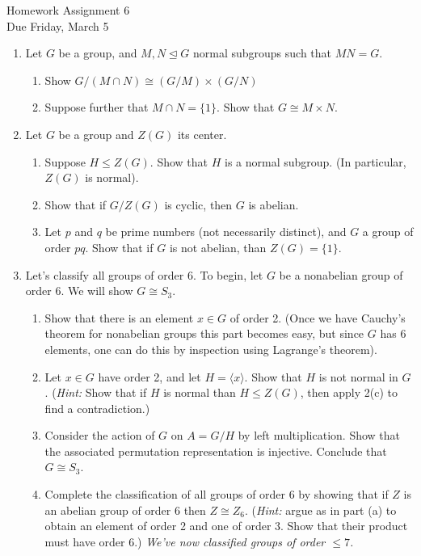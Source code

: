 \documentclass[11pt]{article}
\newcommand{\la}{\langle}
\newcommand{\ra}{\rangle}
\begin{document}
\begin{center}
\Large {Homework Assignment 6}\\
\small {Due Friday, March 5}
\end{center}
\begin{enumerate}
  \item Let $G$ be a group, and $M,N\unlhd G$ normal subgroups such that $MN = G$.
  \begin{enumerate}
    \item Show $G/(M\cap N)\cong (G/M)\times (G/N)$
    \item Suppose further that $M\cap N=\{1\}$.  Show that $G\cong M\times N$.
  \end{enumerate}
  \item Let $G$ be a group and $Z(G)$ its center.
  \begin{enumerate}
    \item Suppose $H\le Z(G)$.  Show that $H$ is a normal subgroup.  (In particular, $Z(G)$ is normal).
    \item Show that if $G/Z(G)$ is cyclic, then $G$ is abelian.
    \item Let $p$ and $q$ be prime numbers (not necessarily distinct), and $G$ a group of order $pq$.  Show that if $G$ is not abelian, than $Z(G) = \{1\}$.
  \end{enumerate}
  \item Let's classify all groups of order 6.  To begin, let $G$ be a nonabelian group of order $6$.  We will show $G\cong S_3$.
  \begin{enumerate}
    \item Show that there is an element $x\in G$ of order 2.  (Once we have Cauchy's theorem for nonabelian groups this part becomes easy, but since $G$ has 6 elements, one can do this by inspection using Lagrange's theorem).
    \item Let $x\in G$ have order 2, and let $H = \la x\ra$.  Show that $H$ is not normal in $G$.  (\textit{Hint:} Show that if $H$ is normal than $H\le Z(G)$, then apply 2(c) to find a contradiction.)
    \item Consider the action of $G$ on $A = G/H$ by left multiplication.  Show that the associated permutation representation is injective.  Conclude that $G\cong S_3$.
    \item Complete the classification of all groups of order 6 by showing that if $Z$ is an abelian group of order 6 then $Z\cong Z_6$.  (\textit{Hint:} argue as in part (a) to obtain an element of order 2 and one of order 3.  Show that their product must have order 6.)  \textit{We've now classified groups of order $\le7$.}

\end{enumerate}
\end{enumerate}
\end{document}
